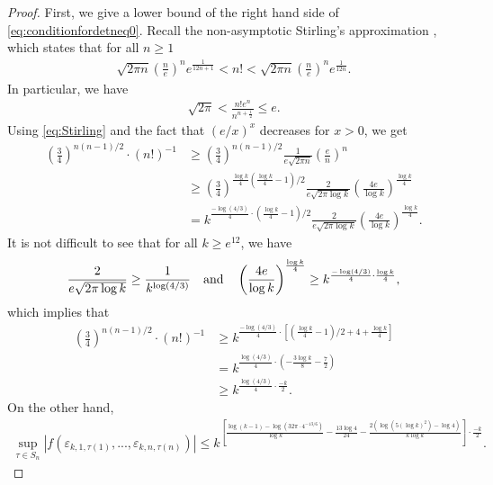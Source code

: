 \documentclass[11pt,letterpaper,reqno]{amsart}
\numberwithin{figure}{section}
\numberwithin{table}{section}
\theoremstyle{definition}
\theoremstyle{plain}
\theoremstyle{definition}
\theoremstyle{definition}
\theoremstyle{remark}
\numberwithin{equation}{section}
\theoremstyle{remark}
\begin{document}
  \begin{proof}
      First, we give a lower bound of the right hand side of \eqref{eq:conditionfordetneq0}. Recall the non-asymptotic Stirling's approximation \cite{Stirling's-formula}, which states that for all $n\geq1$
\begin{align} 
    \sqrt{2\pi n}\left(\frac{n}{e}\right)^ne^{\frac{1}{12n+1}}<n!<   \sqrt{2\pi n}\left(\frac{n}{e}\right)^ne^{\frac{1}{12n}}.
\end{align}
In particular, we have
\begin{align}\sqrt{2\pi}<\frac{n!e^{n}}{n^{n+\frac{1}{2}}}\leq e.\label{eq:Stirling}\end{align}
Using \eqref{eq:Stirling} and the fact that $(e/x)^x$ decreases for $x>0$, we get
      \begin{align}
          \left(\frac{3}{4}\right)^{n(n-1)/2}\cdot(n!)^{-1}&\geq\left(\frac{3}{4}\right)^{n(n-1)/2}\frac{1}{e\sqrt{2\pi n}}\left(\frac{e}{n}\right)^n\\&\geq\left(\frac{3}{4}\right)^{\frac{\log k}{4}\left(\frac{\log k}{4}-1\right)/2}\frac{2}{e\sqrt{2\pi\log k}}\left(\frac{4e}{\log k}\right)^{\frac{\log k}{4}}\\&=k^{\frac{-\log(4/3)}{4}\cdot\left(\frac{\log k}{4}-1\right)/2}\frac{2}{e\sqrt{2\pi\log k}}\left(\frac{4e}{\log k}\right)^{\frac{\log k}{4}}.
      \end{align}
It is not difficult to see that for all $k\geq e^{12}$, we have
\begin{align}
    \frac{2}{e\sqrt{2\pi\log k}}\geq\frac{1}{k^{\log(4/3)}}\quad{\rm and}\quad \left(\frac{4e}{\log k}\right)^{\frac{\log k}{4}}\geq k^{\frac{-\log(4/3)}{4}\cdot\frac{\log k}{4}},
\end{align}
which implies that
\begin{align}
          \left(\frac{3}{4}\right)^{n(n-1)/2}\cdot(n!)^{-1}&\geq k^{\frac{-\log(4/3)}{4}\cdot\left[\left(\frac{\log k}{4}-1\right)/2+4+\frac{\log k}{4}\right]}\\&=k^{\frac{\log(4/3)}{4}\cdot(-\frac{3\log k}{8}-\frac{7}{2})}\\&\geq k^{\frac{\log(4/3)}{4}\cdot\frac{-k}{2}}.
          \end{align}
On the other hand, 
 \begin{align}
     \sup_{\tau\in S_n}|f(\varepsilon_{k,1,\tau(1)},...,\varepsilon_{k,n,\tau(n)})|\leq k^{\left[\frac{\log(k-1)-\log(32\pi\cdot4^{-13/6})}{\log k}-\frac{13\log4}{24}-\frac{2(\log(5(\log k)^2)-\log4)}{k\log k}\right]\cdot\frac{-k}{2}}.    
    \end{align}

\end{proof}
\end{document}
